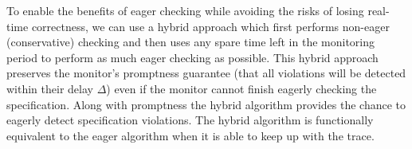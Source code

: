 To enable the benefits of eager checking while avoiding the risks of losing real-time correctness, we can use a hybrid approach which first performs non-eager (conservative) checking and then uses any spare time left in the monitoring period to perform as much eager checking as possible.
This hybrid approach preserves the monitor's promptness guarantee (that all violations will be detected within their delay $\Delta$) even if the monitor cannot finish eagerly checking the specification. Along with promptness the hybrid algorithm provides the chance to eagerly detect specification violations. The hybrid algorithm is functionally equivalent to the eager algorithm when it is able to keep up with the trace.
%
%



